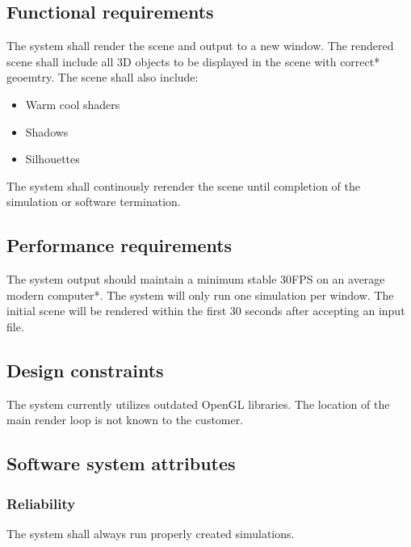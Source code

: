 \documentclass[10pt,journal,compsoc]{IEEEtran}
\begin{document}
\vfill

\subsection{Functional requirements}
\vspace{5mm}
The system shall render the scene and output to a new window.
The rendered scene shall include all 3D objects to be displayed in the scene with correct* geoemtry.
The scene shall also include:
\begin{itemize}
\item Warm cool shaders
\item Shadows
\item Silhouettes
\end{itemize}
The system shall continously rerender the scene until completion of the simulation or software termination.

\vfill

\subsection{Performance requirements}
\vspace{5mm}
The system output should maintain a minimum stable 30FPS on an average modern computer*.
The system will only run one simulation per window.
The initial scene will be rendered within the first 30 seconds after accepting an input file.

\vfill

\subsection{Design constraints}
\vspace{5mm}
The system currently utilizes outdated OpenGL libraries.
The location of the main render loop is not known to the customer.

\vfill

\subsection{Software system attributes}
\vspace{5mm}
\subsubsection{Reliability}
\vspace{5mm}
The system shall always run properly created simulations.
\end{document}
